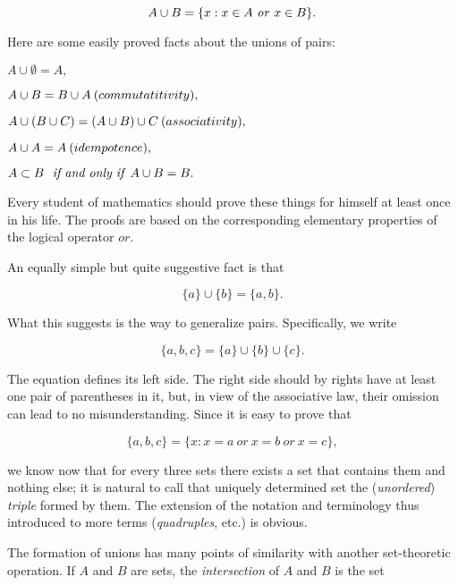 \begin{equation*}
A \cup B = \{x: x \in A \text{ \textit{or} } x \in B \}.
\end{equation*}

Here are some easily proved facts about the unions of pairs:
\begin{center}
$A \cup \emptyset = A,$

$A \cup B =  B \cup A \: (commutatitivity)\index{commutative},$

$A \cup (B \cup C) = (A \cup B) \cup C \: (associativity)\index{associative},$

$A \cup A = A \:(idempotence)\index{idempotent},$

$ A \subset B \text{ \textit{ if and only if} } A \cup B = B.$
\end{center}

Every student of mathematics should prove these things for himself at least once in his life. The proofs are based on the corresponding elementary properties of the logical operator $or$.

An equally simple but quite suggestive fact is that 

\begin{equation*}
\{ a \} \cup \{ b \} = \{ a, b \}.
\end{equation*}

What this suggests is the way to generalize pairs. Specifically, we write 

\begin{equation*}
 \{ a, b, c \} = \{ a \} \cup \{ b \} \cup \{ c \}.
\end{equation*}

The equation defines its left side. The right side should by rights have at least one pair of parentheses in it, but, in view of the associative law, their omission can lead to no misunderstanding. Since it is easy to prove that 

\begin{equation*}
 \{ a, b, c \} = \{ x: x = a \: or \: x = b \: or \: x = c \},
\end{equation*}

we know now that for every three sets there exists a set that contains them and nothing else; it is natural to call that uniquely determined set the (\textit{unordered}) \textit{triple} formed by them. The extension of the notation and terminology thus introduced to more terms (\textit{quadruples}, etc.) is obvious.

The formation of unions has many points of similarity with another set-theoretic operation. If $A$ and $B$ are sets, the \textit{intersection} of $A$ and $B$ is the set 

